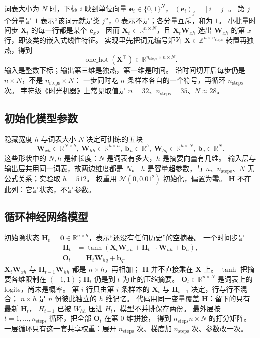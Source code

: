 词表大小为 $N$ 时，下标 $i$ 映到单位向量 $\bm{e}_i\in\{0,1\}^{N}$，
$(\bm{e}_i)_j=[i=j]$。
第 $j$ 个分量是 $1$ 表示“该词元就是类 $j$”，$0$ 表示不是；各分量互斥，和为 $1$。
小批量时间步 $\bm{X}_t$ 的每一行都是某个 $\bm{e}_{x}$，
因而 $\bm{X}_t\in\mathbb{R}^{n\times N}$，且 $\bm{X}_t\bm{W}_{xh}$ 选出 $\bm{W}_{xh}$ 的第 $x$ 行，即该类的嵌入式线性特征。
实现里先把词元编号矩阵 $\bm{X}\in\mathbb{Z}^{n\times n_{\mathrm{steps}}}$ 转置再独热，得到
\[
\operatorname{one\_hot}(\bm{X}^{\top})
\in\mathbb{R}^{n_{\mathrm{steps}}\times n\times N}.
\]
输入是整数下标；输出第三维是独热，第一维是时间。
沿时间切开后每步仍是 $n\times N$，不是 $n_{\mathrm{steps}}\times N$：
一步同时吃 $n$ 条样本各自的一个符号，再循环 $n_{\mathrm{steps}}$ 次。
字符级《时光机器》上常见取值是 $n=32$、$n_{\mathrm{steps}}=35$、$N\approx 28$。

\subsection{初始化模型参数}

隐藏宽度 $h$ 与词表大小 $N$ 决定可训练的五块
\[
\bm{W}_{xh}\in\mathbb{R}^{N\times h},\
\bm{W}_{hh}\in\mathbb{R}^{h\times h},\
\bm{b}_h\in\mathbb{R}^{h},\
\bm{W}_{hq}\in\mathbb{R}^{h\times N},\
\bm{b}_q\in\mathbb{R}^{N}.
\]
这些形状中的 $N,h$ 是轴长度：$N$ 是词表有多大，$h$ 是摘要向量有几维。
输入层与输出层共用同一词表，故两边维度都是 $N$。
$h$ 是容量超参数，与 $n$、$n_{\mathrm{steps}}$、$N$ 无公式关系；实验取 $h=512$。
权重用 $\mathcal{N}(0,0.01^{2})$ 初始化，偏置为零。
$\bm{H}$ 不在此列：它是状态，不是参数。

\subsection{循环神经网络模型}

初始隐状态 $\bm{H}_0=\bm{0}\in\mathbb{R}^{n\times h}$，表示“还没有任何历史”的空摘要。
一个时间步是
\begin{align*}
\bm{H}_t
&=
\tanh(\bm{X}_t\bm{W}_{xh}+\bm{H}_{t-1}\bm{W}_{hh}+\bm{b}_h),
\\
\bm{O}_t
&=
\bm{H}_t\bm{W}_{hq}+\bm{b}_q.
\end{align*}
$\bm{X}_t\bm{W}_{xh}$ 与 $\bm{H}_{t-1}\bm{W}_{hh}$ 都是 $n\times h$，再相加；
$\bm{H}$ 并不直接乘在 $\bm{X}$ 上。
$\tanh$ 把摘要各维限制在 $(-1,1)$；$\bm{H}_t$ 仍是到 $t$ 为止的压缩摘要。
$\bm{O}_t\in\mathbb{R}^{n\times N}$ 是词表上的 logits，尚未是概率。
第 $i$ 行只由第 $i$ 条样本的 $\bm{X}_t$ 与 $\bm{H}_{t-1}$ 决定，行与行不混合；
$n\times h$ 是 $n$ 份彼此独立的 $h$ 维记忆。
代码用同一变量覆盖 $\bm{H}$：留下的只有最新 $\bm{H}_t$，
$H_{t-1}$ 已被 $W_{hh}$ 压进 $H_t$，模型不并排保存两份。
最外层按 $t=1,\ldots,n_{\mathrm{steps}}$ 循环，把全部 $\bm{O}_t$ 在第 $0$ 维拼接，
得到 $n_{\mathrm{steps}}n\times N$ 的打分矩阵。
一层循环只有这一套共享权重：展开 $n_{\mathrm{steps}}$ 次、梯度加 $n_{\mathrm{steps}}$ 次、参数改一次。

